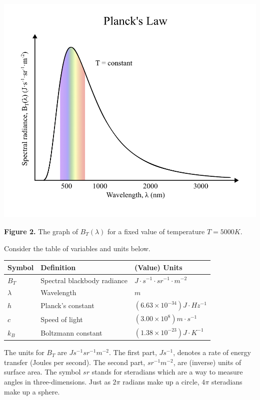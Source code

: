 \documentclass{exam}
\begin{document}
\begin{center}
    \includegraphics[scale=1.2]{planckslaw.png}
    
    \textbf{Figure 2.} The graph of $B_T(\lambda)$ for a fixed value of temperature $T = 5000K$.
\end{center}

Consider the table of variables and units below.

\begin{center}
\begin{tabular}{ l | l | l }
Symbol & Definition & (Value) Units \\
\hline \hline
$B_T$ & Spectral blackbody radiance & $J \cdot s^{-1} \cdot sr^{-1} \cdot 
 m^{-2} $ \\  
$\lambda$ & Wavelength & $m$ \\
$h$ & Planck's constant & $(6.63 \times 10^{-34}) J \cdot Hz^{-1}$ \\
$c$ & Speed of light & $(3.00 \times 10^{8}) m \cdot s^{-1}$ \\
$k_B$ & Boltzmann constant & $(1.38 \times 10^{-23}) J\cdot K^{-1}$
\end{tabular}
\end{center}

{\color{black} \noindent The units for $B_T$ are $J s^{-1} sr^{-1} m^{-2} $. The first part, $J s^{-1}$, denotes a rate of energy transfer (Joules per second). The second part, $sr^{-1} m^{-2}$, are (inverse) units of surface area. The symbol $sr$ stands for steradians which are a way to measure angles in three-dimensions. Just as $2\pi$ radians make up a circle, $4 \pi$ steradians make up a sphere.}
\end{document}
